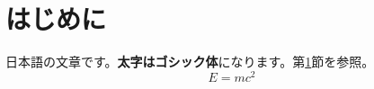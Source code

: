 \documentclass[dvipdfmx]{jsarticle}
\begin{document}
\section{はじめに}\label{sec:intro}
日本語の文章です。\textbf{太字はゴシック体}になります。第\ref{sec:intro}節を参照。
\begin{equation}
  E = mc^2
\end{equation}
\end{document}
